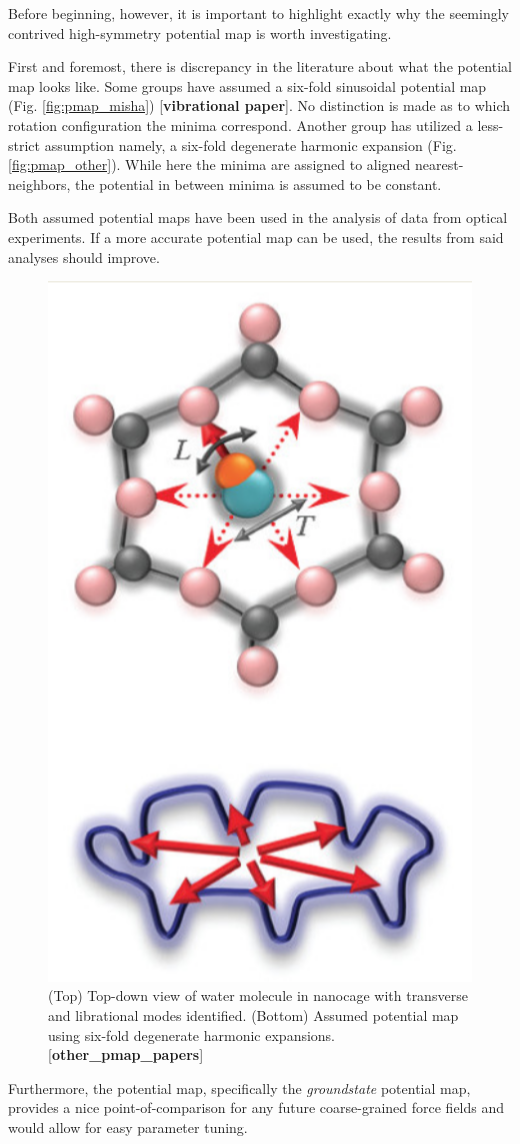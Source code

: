     Before beginning, however, it is important to highlight exactly why the seemingly contrived high-symmetry potential map is worth investigating.
    
    First and foremost, there is discrepancy in the literature about what the potential map looks like. Some groups have assumed a six-fold sinusoidal potential map (Fig. \ref{fig:pmap_misha}) [\textbf{vibrational paper}]. No distinction is made as to which rotation configuration the minima correspond. Another group has utilized a less-strict assumption \textemdash namely, a six-fold degenerate harmonic expansion (Fig. \ref{fig:pmap_other}). While here the minima are assigned to aligned nearest-neighbors, the potential in between minima is assumed to be constant. 
    
    Both assumed potential maps have been used in the analysis of data from optical experiments. If a more accurate potential map can be used, the results from said analyses should improve.

    \begin{figure}
        \centering
        \includegraphics[width=0.5\linewidth]{Figures/System/pmap_other.png}
        \caption{(Top) Top-down view of water molecule in nanocage with transverse and librational modes identified. (Bottom) Assumed potential map using six-fold degenerate harmonic expansions. [\textbf{other_pmap_papers}]}
        \label{fig:pamp_other}
    \end{figure}
    
    Furthermore, the potential map, specifically the \textit{groundstate} potential map, provides a nice point-of-comparison for any future coarse-grained force fields and would allow for easy parameter tuning.

